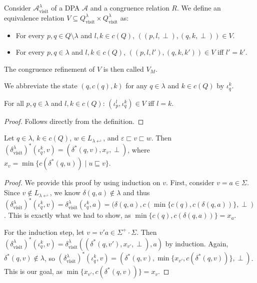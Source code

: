 \begin{defn}
	Consider $\mathcal{A}^\lambda_\text{visit}$ of a DPA $\mathcal{A}$ and a congruence relation $R$. We define an equivalence relation $V \subseteq Q^\lambda_\text{visit} \times Q^\lambda_\text{visit}$ as:
	\begin{itemize}
		\item For every $p, q \in Q \setminus \lambda$ and $l, k \in c(Q)$, $((p, l, \perp), (q, k, \perp)) \in V$.
		\item For every $p, q \in \lambda$ and $l, k \in c(Q)$, $((p, l, l'), (q, k, k')) \in V$ iff $l' = k'$.
	\end{itemize}
	
	The congruence refinement of $V$ is then called $V_M$.
	
	We abbreviate the state $(q, c(q), k)$ for any $q \in \lambda$ and $k \in c(Q)$ by $\iota_q^k$.
\end{defn}

\begin{lem}
	For all $p, q \in \lambda$ and $l, k \in c(Q)$: $(\iota_p^l, \iota_q^k) \in V$ iff $l = k$.
	\label{lem:pr_alg2:iota_equiv}
\end{lem}

\begin{proof}
	Follows directly from the definition.
\end{proof}


\begin{lem}
	Let $q \in \lambda$, $k \in c(Q)$, $w \in L_{\lambda \hookleftarrow}$, and $\varepsilon \sqsubset v \sqsubset w$. Then $(\delta^\lambda_\text{visit})^*(\iota_q^k, v) = (\delta^*(q, v), x_v, \perp)$, where $x_v = \min \{c(\delta^*(q, u)) \mid u \sqsubseteq v\}$.
	\label{lem:pr_alg2:delta_charact_1}
\end{lem}

\begin{proof}
	We provide this proof by using induction on $v$. First, consider $v = a \in \Sigma$. Since $v \notin L_{\lambda \hookleftarrow}$, we know $\delta(q, a) \notin \lambda$ and thus $(\delta^\lambda_\text{visit})^*(\iota_q^k, v) = \delta^\lambda_\text{visit}(\iota_q^k, a) = (\delta(q, a), c(\min \{c(q), c(\delta(q, a))\}, \perp)$. This is exactly what we had to show, as $\min \{c(q), c(\delta(q, a))\} = x_a$.
	
	For the induction step, let $v = v'a \in \Sigma^+ \cdot \Sigma$. Then $(\delta^\lambda_\text{visit})^*(\iota_q^k, v) = \delta^\lambda_\text{visit}((\delta^*(q, v'), x_{v'}, \perp), a)$ by induction. Again, $\delta^*(q, v) \notin \lambda$, so $(\delta^\lambda_\text{visit})^*(\iota_q^k, v) = (\delta^*(q, v), \min \{x_{v'}, c(\delta^*(q, v))\}, \perp)$. This is our goal, as $\min \{x_{v'}, c(\delta^*(q, v))\} = x_v$.
\end{proof}


